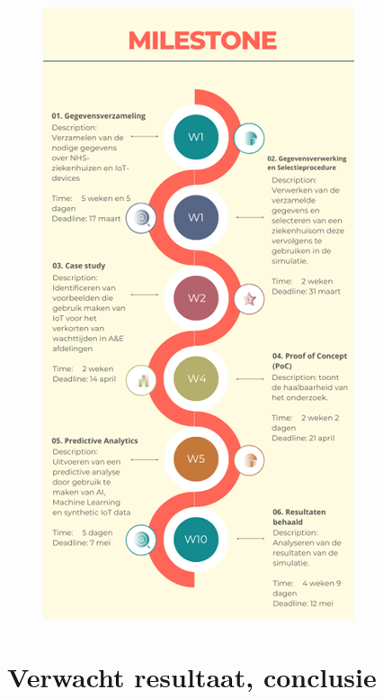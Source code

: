 \begin{figure}[h]
    \centering
    \includegraphics[width=0.93\linewidth]{img/milestone-2.png}
    \label{fig:Figuur8}
\end{figure} 

\section{Verwacht resultaat, conclusie}%
\label{sec:verwachte_resultaten}

